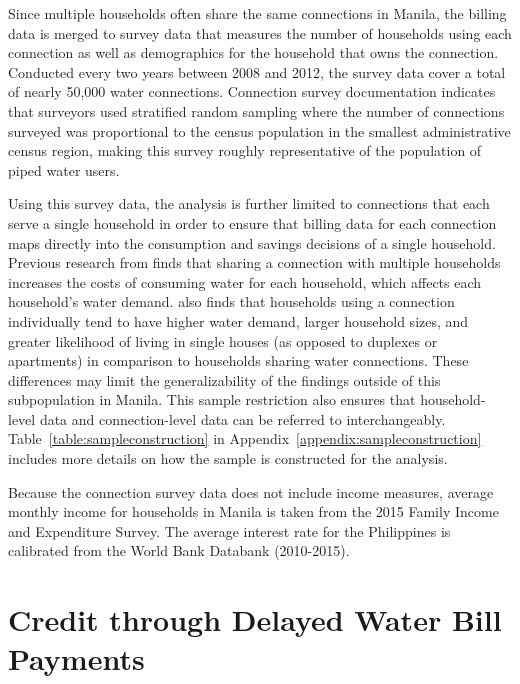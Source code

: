 \documentclass[12pt]{article}
\begin{document}
Since multiple households often share the same connections in Manila, the billing data is merged to survey data that measures the number of households using each connection as well as demographics for the household that owns the connection.  Conducted every two years between 2008 and 2012, the survey data cover a total of nearly 50,000 water connections.  Connection survey documentation indicates that surveyors used stratified random sampling where the number of connections surveyed was proportional to the census population in the smallest administrative census region, making this survey roughly representative of the population of piped water users.  

Using this survey data, the analysis is further limited to connections that each serve a single household in order to ensure that billing data for each connection maps directly into the consumption and savings decisions of a single household.  Previous research from \cite{wjv} finds that sharing a connection with multiple households increases the costs of consuming water for each household, which affects each household's water demand.  \cite{wjv} also finds that households using a connection individually tend to have higher water demand, larger household sizes, and greater likelihood of living in single houses (as opposed to duplexes or apartments) in comparison to households sharing water connections.  These differences may limit the generalizability of the findings outside of this subpopulation in Manila.  This sample restriction also ensures that household-level data and connection-level data can be referred to interchangeably.  Table~\ref{table:sampleconstruction} in Appendix~\ref{appendix:sampleconstruction} includes more details on how the sample is constructed for the analysis. 

Because the connection survey data does not include income measures, average monthly income for households in Manila is taken from the 2015 Family Income and Expenditure Survey.  The average interest rate for the Philippines is calibrated from the World Bank Databank (2010-2015).

\section{Credit through Delayed Water Bill Payments}\label{section:descriptives}

\end{document}

